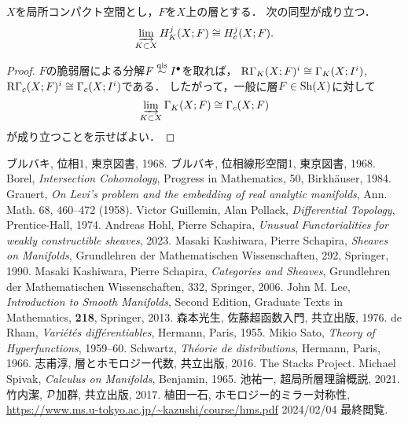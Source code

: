 \begin{PRP}
    \(X\)を局所コンパクト空間とし，\(F\)を\(X\)上の層とする．
    次の同型が成り立つ．
    \[
        \indlim[K\subset X]H_K^j(X;F)
        \cong
        H^j_c(X;F).
    \]
\end{PRP}
\begin{proof}
    \(F\)の脆弱層による分解\(F\qis I^\bullet\)を取れば，
    \(\RG_K(X;F)^i\cong\Gamma_K(X;I^i)\), 
    \(\RG_c(X;F)^i\cong\Gamma_c(X;I^i)\)である．
    したがって，一般に層\(F\in\Sh(X)\)に対して\[
        \indlim[K\subset X]\Gamma_K(X;F)\cong \Gamma_c(X;F)
    \]が成り立つことを示せばよい．
\end{proof}

\begin{thebibliography}{20} 
     ブルバキ, 位相1, 東京図書, 1968.
     ブルバキ, 位相線形空間1, 東京図書, 1968.
     Borel, 
    \textit{Intersection Cohomology}, 
    Progress in Mathematics, 50, Birkh\"auser, 1984.
 Grauert, 
    \textit{On Levi's problem and the embedding of real analytic manifolds}, 
    Ann. Math. 68, 460--472 (1958).
 Victor Guillemin, Alan Pollack, 
    \textit{Differential Topology}, 
    Prentice-Hall, 1974.
     Andreas Hohl, Pierre Schapira, 
    \textit{Unusual Functorialities for weakly constructible sheaves}, 
    2023.
     Masaki Kashiwara, Pierre Schapira, 
    \textit{Sheaves on Manifolds}, 
    Grundlehren der Mathematischen Wissenschaften, 292, Springer, 1990.
 Masaki Kashiwara, Pierre Schapira, 
    \textit{Categories and Sheaves}, 
    Grundlehren der Mathematischen Wissenschaften, 332, Springer, 2006.
     John M. Lee, 
    \textit{Introduction to Smooth Manifolds}, Second Edition,
    Graduate Texts in Mathematics, \textbf{218}, Springer, 2013.
     森本光生, 佐藤超函数入門, 共立出版, 1976. 
 de Rham, 
    \textit{Vari\'et\'es diff\'erentiables}, 
    Hermann, Paris, 1955.
 Mikio Sato, 
    \textit{Theory of Hyperfunctions}, 
    1959--60.
 Schwartz, 
    \textit{Th\'eorie de distributions}, 
    Hermann, Paris, 1966.
 志甫淳, 層とホモロジー代数, 共立出版, 2016.
 The Stacks Project.
 Michael Spivak, 
\textit{Calculus on Manifolds}, 
Benjamin, 1965.
 池祐一, 超局所層理論概説, 2021.
 竹内潔, \(\D\)加群, 共立出版, 2017.
 植田一石, ホモロジー的ミラー対称性, \url{https://www.ms.u-tokyo.ac.jp/~kazushi/course/hms.pdf} 2024/02/04 最終閲覧.

\end{thebibliography}




